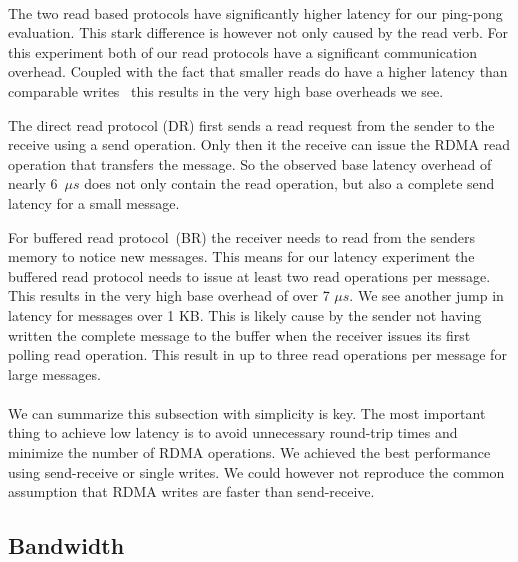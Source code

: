 \paragraph{} The two read based protocols have significantly higher latency for our ping-pong evaluation. This stark difference
is however not only caused by the read verb. For this experiment both of our read protocols have a significant 
communication overhead. Coupled with the fact that smaller reads do have a higher latency than comparable writes~\cite{}
this results in the very high base overheads we see.

The direct read protocol (DR) first sends a read request from the sender to the receive using a send operation. Only then it the
receive can issue the RDMA read operation that transfers the message. So the observed base latency overhead of nearly 6~$\mu s$
does not only contain the read operation, but also a complete send latency for a small message.

For buffered read protocol~(BR) the receiver needs to read from the senders memory to notice new messages. This means for our
latency experiment the buffered read protocol needs to issue at least two read operations per message. This results in the
very high base overhead of over 7 $\mu s$. We see another jump in latency for messages over 1 KB. This is likely cause by the
sender not having written the complete message to the buffer when the receiver issues its first polling read operation. 
This result in up to three read operations per message for large messages.

\paragraph{} We can summarize this subsection with simplicity is key. The most important thing to achieve low 
latency is to avoid unnecessary round-trip times and minimize the number of RDMA operations. We achieved the best performance 
using send-receive or single writes. We could however not reproduce the common assumption that RDMA writes are faster 
than send-receive.






\pagebreak

\subsection{Bandwidth}

